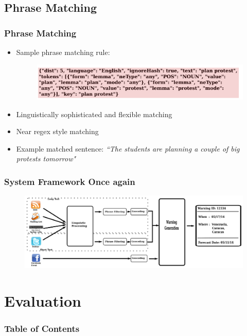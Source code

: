 \documentclass[red]{beamer}
\begin{document}
\subsection{Phrase Matching}
\begin{frame}
    \frametitle{Phrase Matching}
    \begin{itemize}
        \item
            Sample phrase matching rule:
            \begin{figure}
                \includegraphics[scale=0.5]{phrase_rule}
            \end{figure}
        \item
            Linguistically sophisticated and flexible matching
        \item
            Near regex style matching
        \item
            Example matched sentence:
            {\em ``The students are planning a couple of big protests tomorrow"}
    \end{itemize}
\end{frame}


\begin{frame}
    \frametitle{System Framework Once again}
    \begin{figure}
        \centering
        \includegraphics[height=0.6\textheight,width=\textwidth]{pipeline}
    \end{figure}
\end{frame}

\section{Evaluation}
\begin{frame}
\frametitle{Table of Contents}
\tableofcontents[currentsection]
\end{frame}
\end{document}

